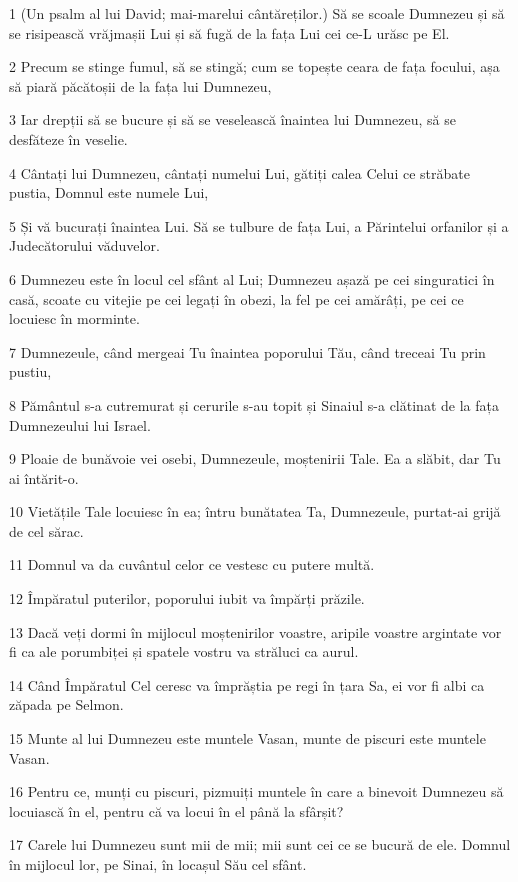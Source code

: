 \par 1 (Un psalm al lui David; mai-marelui cântăreților.) Să se scoale Dumnezeu și să se risipească vrăjmașii Lui și să fugă de la fața Lui cei ce-L urăsc pe El.
\par 2 Precum se stinge fumul, să se stingă; cum se topește ceara de fața focului, așa să piară păcătoșii de la fața lui Dumnezeu,
\par 3 Iar drepții să se bucure și să se veselească înaintea lui Dumnezeu, să se desfăteze în veselie.
\par 4 Cântați lui Dumnezeu, cântați numelui Lui, gătiți calea Celui ce străbate pustia, Domnul este numele Lui,
\par 5 Și vă bucurați înaintea Lui. Să se tulbure de fața Lui, a Părintelui orfanilor și a Judecătorului văduvelor.
\par 6 Dumnezeu este în locul cel sfânt al Lui; Dumnezeu așază pe cei singuratici în casă, scoate cu vitejie pe cei legați în obezi, la fel pe cei amărâți, pe cei ce locuiesc în morminte.
\par 7 Dumnezeule, când mergeai Tu înaintea poporului Tău, când treceai Tu prin pustiu,
\par 8 Pământul s-a cutremurat și cerurile s-au topit și Sinaiul s-a clătinat de la fața Dumnezeului lui Israel.
\par 9 Ploaie de bunăvoie vei osebi, Dumnezeule, moștenirii Tale. Ea a slăbit, dar Tu ai întărit-o.
\par 10 Vietățile Tale locuiesc în ea; întru bunătatea Ta, Dumnezeule, purtat-ai grijă de cel sărac.
\par 11 Domnul va da cuvântul celor ce vestesc cu putere multă.
\par 12 Împăratul puterilor, poporului iubit va împărți prăzile.
\par 13 Dacă veți dormi în mijlocul moștenirilor voastre, aripile voastre argintate vor fi ca ale porumbiței și spatele vostru va străluci ca aurul.
\par 14 Când Împăratul Cel ceresc va împrăștia pe regi în țara Sa, ei vor fi albi ca zăpada pe Selmon.
\par 15 Munte al lui Dumnezeu este muntele Vasan, munte de piscuri este muntele Vasan.
\par 16 Pentru ce, munți cu piscuri, pizmuiți muntele în care a binevoit Dumnezeu să locuiască în el, pentru că va locui în el până la sfârșit?
\par 17 Carele lui Dumnezeu sunt mii de mii; mii sunt cei ce se bucură de ele. Domnul în mijlocul lor, pe Sinai, în locașul Său cel sfânt.
